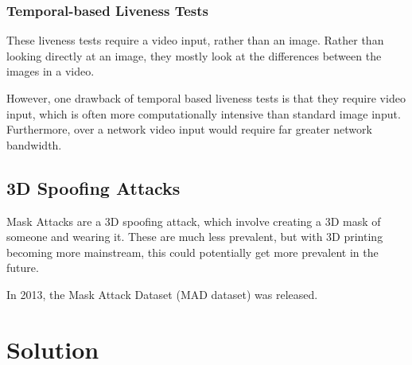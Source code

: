 \documentclass[10pt,a4paper]{article}
\begin{document}
        \subsubsection{Temporal-based Liveness Tests}
        These liveness tests require a video input, rather than an image. Rather than looking directly at an image, they mostly look at the differences between the images in a video.
        

        However, one drawback of temporal based liveness tests is that they require video input, which is often more computationally intensive than standard image input. Furthermore, over a network video input would require
        far greater network bandwidth.

        
    \subsection{3D Spoofing Attacks}
        Mask Attacks are a 3D spoofing attack, which involve creating a 3D mask of someone and wearing it. \cite{FaceSpoofingAttacksStudy} These are much less prevalent, but with 3D printing becoming more mainstream, this
        could potentially get more prevalent in the future.

        In 2013, the Mask Attack Dataset (MAD dataset) was released. \cite{3DMadDataset}



\section{Solution}
\end{document}
